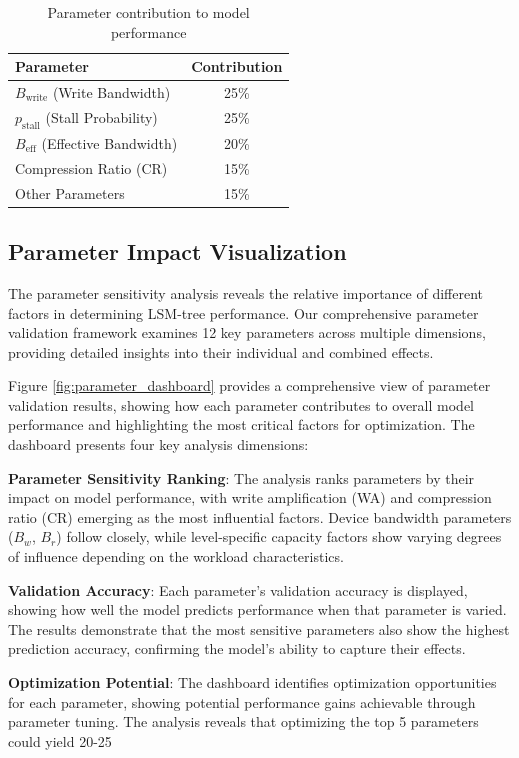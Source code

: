 \documentclass[11pt]{article}
\newcommand{\pstall}{p_{\text{stall}}}
\begin{document}
\begin{table}[H]
\centering
\begin{tabular}{@{}lc@{}}
\toprule
\textbf{Parameter} & \textbf{Contribution} \\
\midrule
$B_{\text{write}}$ (Write Bandwidth) & 25\% \\
$\pstall$ (Stall Probability) & 25\% \\
$B_{\text{eff}}$ (Effective Bandwidth) & 20\% \\
Compression Ratio (CR) & 15\% \\
Other Parameters & 15\% \\
\bottomrule
\end{tabular}
\caption{Parameter contribution to model performance}
\label{tab:parameter_contribution}
\end{table}

\subsection{Parameter Impact Visualization}

The parameter sensitivity analysis reveals the relative importance of different factors in determining LSM-tree performance. Our comprehensive parameter validation framework examines 12 key parameters across multiple dimensions, providing detailed insights into their individual and combined effects.

Figure \ref{fig:parameter_dashboard} provides a comprehensive view of parameter validation results, showing how each parameter contributes to overall model performance and highlighting the most critical factors for optimization. The dashboard presents four key analysis dimensions:

\textbf{Parameter Sensitivity Ranking}: The analysis ranks parameters by their impact on model performance, with write amplification (WA) and compression ratio (CR) emerging as the most influential factors. Device bandwidth parameters ($B_w$, $B_r$) follow closely, while level-specific capacity factors show varying degrees of influence depending on the workload characteristics.

\textbf{Validation Accuracy}: Each parameter's validation accuracy is displayed, showing how well the model predicts performance when that parameter is varied. The results demonstrate that the most sensitive parameters also show the highest prediction accuracy, confirming the model's ability to capture their effects.

\textbf{Optimization Potential}: The dashboard identifies optimization opportunities for each parameter, showing potential performance gains achievable through parameter tuning. The analysis reveals that optimizing the top 5 parameters could yield 20-25%
\end{document}
